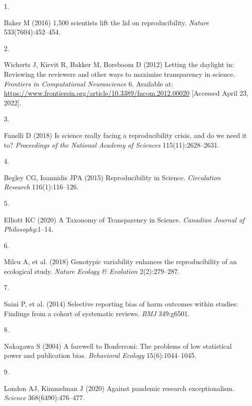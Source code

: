 \documentclass[9pt,twocolumn,twoside,]{pnas-new}
\newlength{\cslhangindent}
\newlength{\csllabelwidth}
\newlength{\cslentryspacingunit} %
\newenvironment{CSLReferences}[2] %
 {%
  \setlength{\parindent}{0pt}
  \ifodd #1
  \let\oldpar\par
  \def\par{\hangindent=\cslhangindent\oldpar}
  \fi
  \setlength{\parskip}{#2\cslentryspacingunit}
 }%
 {}
\newcommand{\CSLLeftMargin}[1]{\parbox[t]{\csllabelwidth}{#1}}
\newcommand{\CSLRightInline}[1]{\parbox[t]{\linewidth - \csllabelwidth}{#1}\break}
\begin{document}
\showmatmethods
\showacknow
\pnasbreak

\hypertarget{refs}{}
\begin{CSLReferences}{0}{0}
\leavevmode{}%
\CSLLeftMargin{1. }
\CSLRightInline{Baker M (2016) 1,500 scientists lift the lid on
reproducibility. \emph{Nature} 533(7604):452--454.}

\leavevmode{}%
\CSLLeftMargin{2. }
\CSLRightInline{Wicherts J, Kievit R, Bakker M, Borsboom D (2012)
Letting the daylight in: {Reviewing} the reviewers and other ways to
maximize transparency in science. \emph{Frontiers in Computational
Neuroscience} 6. Available at:
\url{https://www.frontiersin.org/article/10.3389/fncom.2012.00020}
{[}Accessed April 23, 2022{]}.}

\leavevmode{}%
\CSLLeftMargin{3. }
\CSLRightInline{Fanelli D (2018) Is science really facing a
reproducibility crisis, and do we need it to? \emph{Proceedings of the
National Academy of Sciences} 115(11):2628--2631.}

\leavevmode{}%
\CSLLeftMargin{4. }
\CSLRightInline{Begley CG, Ioannidis JPA (2015) Reproducibility in
{Science}. \emph{Circulation Research} 116(1):116--126.}

\leavevmode{}%
\CSLLeftMargin{5. }
\CSLRightInline{Elliott KC (2020) A {Taxonomy} of {Transparency} in
{Science}. \emph{Canadian Journal of Philosophy}:1--14.}

\leavevmode{}%
\CSLLeftMargin{6. }
\CSLRightInline{Milcu A, et al. (2018) Genotypic variability enhances
the reproducibility of an ecological study. \emph{Nature Ecology \&
Evolution} 2(2):279--287.}

\leavevmode{}%
\CSLLeftMargin{7. }
\CSLRightInline{Saini P, et al. (2014) Selective reporting bias of harm
outcomes within studies: Findings from a cohort of systematic reviews.
\emph{BMJ} 349:g6501.}

\leavevmode{}%
\CSLLeftMargin{8. }
\CSLRightInline{Nakagawa S (2004) A farewell to {Bonferroni}: The
problems of low statistical power and publication bias. \emph{Behavioral
Ecology} 15(6):1044--1045.}

\leavevmode{}%
\CSLLeftMargin{9. }
\CSLRightInline{London AJ, Kimmelman J (2020) Against pandemic research
exceptionalism. \emph{Science} 368(6490):476--477.}


\end{CSLReferences}
\end{document}
